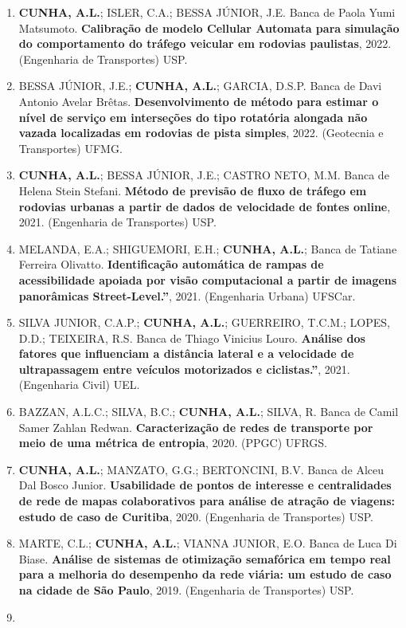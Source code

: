 \documentclass[
  brazilian,
  11pt,
  a4paper,
]{article}
\begin{document}
\begin{enumerate}
  de Produção) UNIFEI.
\item
  \textbf{CUNHA, A.L.}; ISLER, C.A.; BESSA JÚNIOR, J.E. Banca de Paola
  Yumi Matsumoto. \textbf{Calibração de modelo Cellular Automata para
  simulação do comportamento do tráfego veicular em rodovias paulistas},
  2022. (Engenharia de Transportes) USP.
\item
  BESSA JÚNIOR, J.E.; \textbf{CUNHA, A.L.}; GARCIA, D.S.P. Banca de Davi
  Antonio Avelar Brêtas. \textbf{Desenvolvimento de método para estimar
  o nível de serviço em interseções do tipo rotatória alongada não
  vazada localizadas em rodovias de pista simples}, 2022. (Geotecnia e
  Transportes) UFMG.
\item
  \textbf{CUNHA, A.L.}; BESSA JÚNIOR, J.E.; CASTRO NETO, M.M. Banca de
  Helena Stein Stefani. \textbf{Método de previsão de fluxo de tráfego
  em rodovias urbanas a partir de dados de velocidade de fontes online},
  2021. (Engenharia de Transportes) USP.
\item
  MELANDA, E.A.; SHIGUEMORI, E.H.; \textbf{CUNHA, A.L.}; Banca de
  Tatiane Ferreira Olivatto. \textbf{Identificação automática de rampas
  de acessibilidade apoiada por visão computacional a partir de imagens
  panorâmicas Street-Level.''}, 2021. (Engenharia Urbana) UFSCar.
\item
  SILVA JUNIOR, C.A.P.; \textbf{CUNHA, A.L.}; GUERREIRO, T.C.M.; LOPES,
  D.D.; TEIXEIRA, R.S. Banca de Thiago Vinicius Louro. \textbf{Análise
  dos fatores que influenciam a distância lateral e a velocidade de
  ultrapassagem entre veículos motorizados e ciclistas.''}, 2021.
  (Engenharia Civil) UEL.
\item
  BAZZAN, A.L.C.; SILVA, B.C.; \textbf{CUNHA, A.L.}; SILVA, R. Banca de
  Camil Samer Zahlan Redwan. \textbf{Caracterização de redes de
  transporte por meio de uma métrica de entropia}, 2020. (PPGC) UFRGS.
\item
  \textbf{CUNHA, A.L.}; MANZATO, G.G.; BERTONCINI, B.V. Banca de Alceu
  Dal Bosco Junior. \textbf{Usabilidade de pontos de interesse e
  centralidades de rede de mapas colaborativos para análise de atração
  de viagens: estudo de caso de Curitiba}, 2020. (Engenharia de
  Transportes) USP.
\item
  MARTE, C.L.; \textbf{CUNHA, A.L.}; VIANNA JUNIOR, E.O. Banca de Luca
  Di Biase. \textbf{Análise de sistemas de otimização semafórica em
  tempo real para a melhoria do desempenho da rede viária: um estudo de
  caso na cidade de São Paulo}, 2019. (Engenharia de Transportes) USP.
\item

\end{enumerate}
\end{document}
